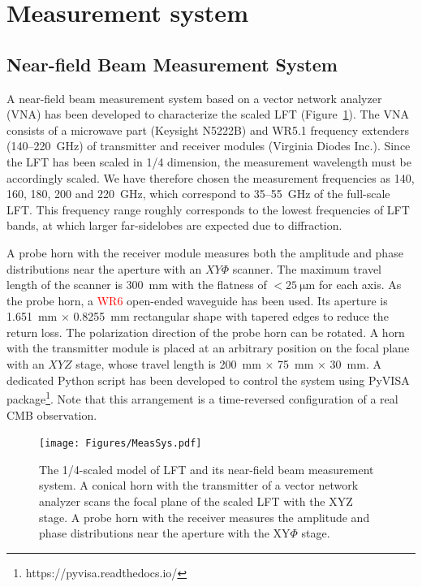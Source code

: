 \documentclass[journal]{IEEEtran}
\newcommand{\red}[1]{\textcolor{red}{#1}}
\begin{document}
\section{Measurement system}
%
\subsection{Near-field Beam Measurement System}
\par
A near-field beam measurement system based on a vector network analyzer (VNA) has been developed to characterize the scaled LFT (Figure~\ref{fig:MeasSys}). 
The VNA consists of a microwave part (Keysight N5222B) and WR5.1 frequency extenders (140--220~GHz) of transmitter and receiver modules (Virginia Diodes Inc.).
Since the LFT has been scaled in 1/4 dimension, the measurement wavelength must be accordingly scaled. We have therefore chosen the measurement frequencies as 140, 160, 180, 200 and 220~GHz, which correspond to 35--55~GHz of the full-scale LFT. 
This frequency range roughly corresponds to the lowest frequencies of LFT bands,
at which larger far-sidelobes are expected due to diffraction.  
%
\par
A probe horn with the receiver module measures both the amplitude and phase distributions near the aperture with an $XY\Phi$ scanner. The maximum travel length of the scanner is 300~mm with the flatness of $<25~\mathrm{\mu m}$ for each axis. As the probe horn, a \red{WR6} open-ended waveguide has been used. Its aperture is 1.651~mm $\times$ 0.8255~mm rectangular shape with tapered edges to reduce the return loss. The polarization direction of the probe horn can be rotated.
A horn with the transmitter module is placed at an arbitrary position on the focal plane with an $XYZ$ stage, whose travel length is 200~mm $\times$ 75~mm $\times$ 30~mm.
A dedicated Python script has been developed to control the system using PyVISA package\footnote{https://pyvisa.readthedocs.io/}.
Note that this arrangement is a time-reversed configuration of a real CMB observation.
%
\begin{figure}[!t]
\centering
\texttt{[image: Figures/MeasSys.pdf]}
\caption{The 1/4-scaled model of LFT and its near-field beam measurement system. A conical horn with the transmitter of a vector network analyzer scans the focal plane of the scaled LFT with the XYZ stage. A probe horn with the receiver measures the amplitude and phase distributions near the aperture with the XY$\Phi$ stage. 
}
\label{fig:MeasSys}
\end{figure}
%
%
\end{document}
